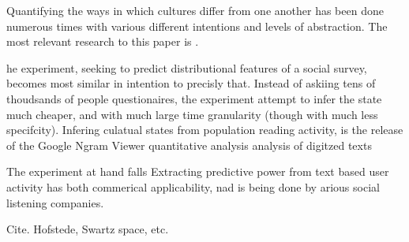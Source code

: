 Quantifying the ways in which cultures differ from one another has been done numerous times with various different intentions and levels of abstraction.
The most relevant research to this paper is \citet{Haidth2004}.


he experiment, seeking to predict distributional features of a social survey, becomes most similar in intention to precisly that.
Instead of askiing tens of thoudsands of people questionaires,
the experiment attempt to infer the state much cheaper, and with much large time granularity (though with much less specifcity).
Infering culatual states from population reading activity,
is
 the release of the Google Ngram Viewer quantitative analysis analysis of digitzed texts


The experiment at hand falls 
Extracting predictive power from text based user activity has both commerical applicability, nad is being done by arious social listening companies.

Cite. Hofstede, Swartz space, etc.
